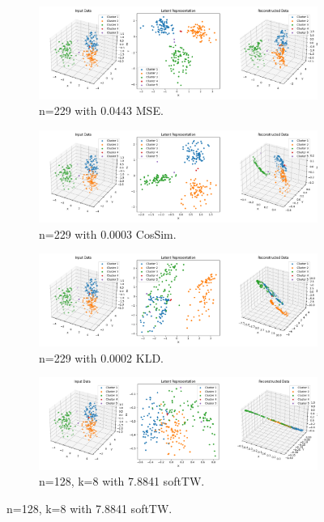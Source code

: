 \begin{figure}[htbp]
  \centering
  \begin{subfigure}[b]{1.0\textwidth}
    \centering
    \includegraphics[width=\linewidth]{images/RQ2/mse/3DBlobsM_-1_0.0443.png}
    \caption{n=229 with 0.0443 MSE.}
    \label{fig:RQ2/mse/3DBlobsM}
  \end{subfigure}
  \hfill
  \begin{subfigure}[b]{1.0\textwidth}
    \centering
    \includegraphics[width=\linewidth]{images/RQ2/csi/3DBlobsM_-1_0.0003.png}
    \caption{n=229 with 0.0003 CosSim.}
    \label{fig:RQ2/csi/3DBlobsM}
  \end{subfigure}
  \hfill
  \begin{subfigure}[b]{1.0\textwidth}
    \centering
    \includegraphics[width=\linewidth]{images/RQ2/kld/3DBlobsM_-1_0.0002.png}
    \caption{n=229 with 0.0002 KLD.}
    \label{fig:RQ2/kld/3DBlobsM}
  \end{subfigure}
  \hfill
  \begin{subfigure}[b]{1.0\textwidth}
    \centering
    \includegraphics[width=\linewidth]{images/RQ2/tru/3DBlobsM_128n_8k_7.8841.png}
    \caption{n=128, k=8 with 7.8841 softTW.}
    \label{fig:RQ2/tru/3DBlobsM}
  \end{subfigure}


\end{figure}
